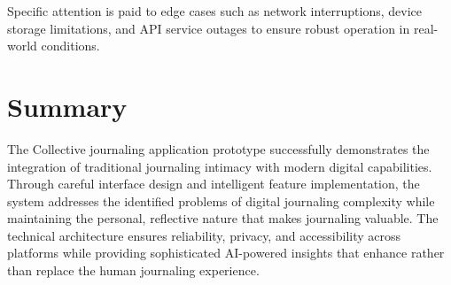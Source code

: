 Specific attention is paid to edge cases such as network interruptions, device storage limitations, and API service outages to ensure robust operation in real-world conditions.

\section{Summary}

The Collective journaling application prototype successfully demonstrates the integration of traditional journaling intimacy with modern digital capabilities. Through careful interface design and intelligent feature implementation, the system addresses the identified problems of digital journaling complexity while maintaining the personal, reflective nature that makes journaling valuable. The technical architecture ensures reliability, privacy, and accessibility across platforms while providing sophisticated AI-powered insights that enhance rather than replace the human journaling experience.
